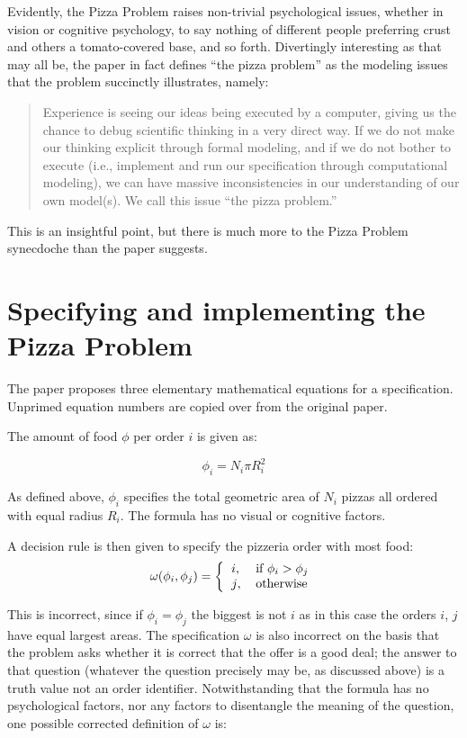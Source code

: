 \documentclass[11pt]{article}
\begin{document}
Evidently, the Pizza Problem raises non-trivial psychological issues, whether in vision or cognitive psychology, to say nothing of different people preferring crust and others a tomato-covered base, and so forth. Divertingly interesting as that may all be, the paper \cite{pizzap} in fact defines ``the pizza problem'' as the modeling issues that the problem succinctly illustrates, namely:

\begin{quote}\sf
Experience is seeing our ideas being executed by a computer, giving us the chance to debug scientific thinking in a very direct way. If we do not make our thinking explicit through formal modeling, and if we do not bother to execute (i.e., implement and run our specification through computational modeling), we can have massive inconsistencies in our understanding of our own model(s). We call this issue ``the pizza problem.''
\cite{pizzap}
\end{quote}

This is an insightful point, but there is much more to the Pizza Problem synecdoche than the paper suggests.

\section{Specifying and implementing the Pizza Problem}
The paper \cite{pizzap} proposes three elementary mathematical equations for a specification. Unprimed equation numbers are copied over from the original paper.

The amount of food $\phi$ per order $i$ is given as:

\begin{equation}\label{eqn-area}
\phi_i = N_i \pi R_i^2
\end{equation}

As defined above, $\phi_i$ specifies the total geometric area of $N_i$ pizzas all ordered with equal radius $R_i$. The formula has no visual or cognitive factors.

A decision rule is then given to specify the pizzeria order with most food:
\begin{equation}\label{eqn-specification}
\omega(\phi_i,\phi_j)=\left\{\begin{tabular}{ll}
$i$,& if $\phi_i>\phi_j$\\
$j$,&otherwise
\end{tabular}\right.
\end{equation}

This is incorrect, since if $\phi_i=\phi_j$ the biggest is not $i$ as in this case the orders $i$, $j$ have equal largest areas. The specification $\omega$ is also incorrect on the basis that the problem asks whether it is correct that the offer is a good deal; the answer to that question (whatever the question precisely may be, as discussed above) is a truth value not an order identifier. Notwithstanding that the formula has no psychological factors, nor any factors to disentangle the meaning of the question, one possible corrected definition of $\omega$ is: 
\end{document}
